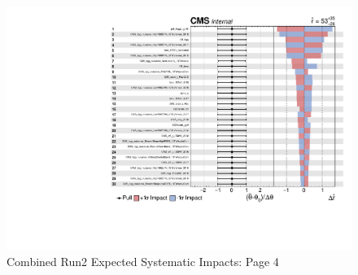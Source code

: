 \newpage
\begin{figure}[h!]
    \centering
    \includegraphics[page=4, width=\textwidth]{Sections/HHWWgg/images/Impacts/HHWWgg_Impacts_expected.pdf}
    \caption{Combined Run2 Expected Systematic Impacts: Page 4}
    \label{fig:Impacts_Run2_expected-4}
\end{figure}


